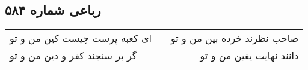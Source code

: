 \begin{center}
\section*{رباعی شماره ۵۸۴}
\label{sec:sh584}
\begin{longtable}{l p{0.5cm} r}
ای کعبه پرست چیست کین من و تو
&&
صاحب نظرند خرده بین من و تو
\\
گر بر سنجند کفر و دین من و تو
&&
دانند نهایت یقین من و تو
\\
\end{longtable}
\end{center}

